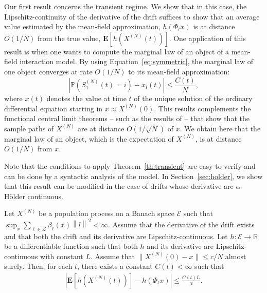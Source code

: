 \documentclass[sigconf]{acmart}
\newcommand\SN{S^{(N)}}
\newcommand\XN{X^{(N)}}
\newcommand\E{\mathcal{E}}
\newcommand\R{\mathbb{R}}
\newcommand\calL{\mathcal{L}}
\newcommand\esp[1]{\mathbf{E}\left[#1\right]}
\newcommand\sesp[1]{\mathbf{E}[#1]}
\newcommand\norm[1]{\left\|#1\right\|}
\newcommand\snorm[1]{\|#1\|}
\newcommand\abs[1]{\left|#1\right|}
\newcommand\proba[1]{\mathbb{P}\left(#1\right)}
\begin{document}
Our first result concerns the transient regime. We show that in this
case, the Lipschitz-continuity of the derivative of the drift
suffices to show that an average value estimated by the mean-field
approximation, $h(\Phi_tx)$ is at distance $O(1/N)$ from the true
value, $\sesp{h(\XN(t))}$.  One application of this result is when one
wants to compute the marginal law of an object of a mean-field
interaction model.  By using Equation~\eqref{eq:symmetric}, the
marginal law of one object converges at rate $O(1/N)$ to its
mean-field approximation:
\begin{equation*}
  \abs{\proba{\SN_1(t)=i} - x_i(t)} \le \frac{C(t)}{N},
\end{equation*}
where $x(t)$ denotes the value at time $t$ of the unique solution of
the ordinary differential equation starting in $x\approx\XN(0)$. This
results complements the functional central limit theorems -- such as
the results of \cite{kurtz1978strong} -- that show that the sample
paths of $\XN$ are at distance $O(1/\sqrt{N})$ of $x$. We obtain here
that the marginal law of an object, which is the expectation of $\XN$,
is at distance $O(1/N)$ from $x$.

Note that the conditions to apply Theorem~\ref{th:transient} are easy
to verify and can be done by a syntactic analysis of the model.  In
Section~\ref{sec:holder}, we show that this result can be modified in
the case of drifts whose derivative are $\alpha$-Hölder continuous.



\begin{theorem}
  \label{th:transient}
  Let $\XN$ be a population process on a Banach space $\E$ such that
  $\sup_x\sum_{\ell\in\calL}\beta_\ell(x)\norm{l}^2<\infty$. Assume
  that the derivative of the drift exists and that both the drift and
  its derivative are Lipschitz-continuous.  Let $h:\E\to\R$ be a
  differentiable function such that both $h$ and its derivative are
  Lipschitz-continuous with constant $L$. Assume that
  $\snorm{\XN(0)-x}\le c/N$ almost surely. Then, for each $t$, there
  exists a constant $C(t)<\infty$ such that
  \begin{align}
    \label{eq:th_transient}
    \abs{\esp{h(\XN(t))} - h(\Phi_tx)} \le \frac{C(t)L}{N}.
  \end{align}
\end{theorem}
\end{document}
